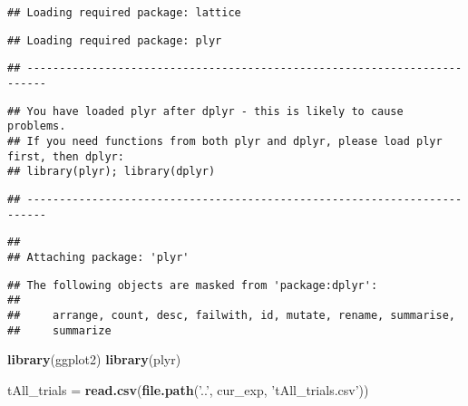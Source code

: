 \documentclass[]{article}
\newenvironment{Shaded}{\begin{snugshade}}{\end{snugshade}}
\newcommand{\KeywordTok}[1]{\textcolor[rgb]{0.13,0.29,0.53}{\textbf{#1}}}
\newcommand{\NormalTok}[1]{#1}
\newcommand{\StringTok}[1]{\textcolor[rgb]{0.31,0.60,0.02}{#1}}
\begin{document}
\begin{verbatim}
## Loading required package: lattice
\end{verbatim}

\begin{verbatim}
## Loading required package: plyr
\end{verbatim}

\begin{verbatim}
## -------------------------------------------------------------------------
\end{verbatim}

\begin{verbatim}
## You have loaded plyr after dplyr - this is likely to cause problems.
## If you need functions from both plyr and dplyr, please load plyr first, then dplyr:
## library(plyr); library(dplyr)
\end{verbatim}

\begin{verbatim}
## -------------------------------------------------------------------------
\end{verbatim}

\begin{verbatim}
## 
## Attaching package: 'plyr'
\end{verbatim}

\begin{verbatim}
## The following objects are masked from 'package:dplyr':
## 
##     arrange, count, desc, failwith, id, mutate, rename, summarise,
##     summarize
\end{verbatim}

\begin{Shaded}
\begin{Highlighting}[]
  \KeywordTok{library}\NormalTok{(ggplot2)}
  \KeywordTok{library}\NormalTok{(plyr)}
\end{Highlighting}
\end{Shaded}

\begin{Shaded}
\begin{Highlighting}[]
\NormalTok{tAll_trials =}\StringTok{ }\KeywordTok{read.csv}\NormalTok{(}\KeywordTok{file.path}\NormalTok{(}\StringTok{'..'}\NormalTok{, cur_exp, }\StringTok{'tAll_trials.csv'}\NormalTok{))}
\end{Highlighting}
\end{Shaded}
\end{document}
